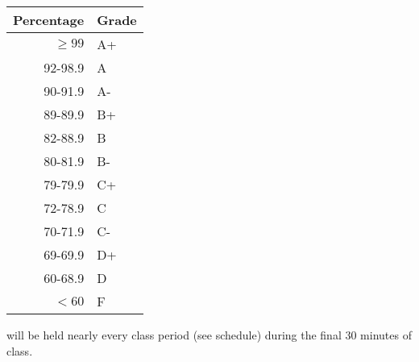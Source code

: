 \documentclass{tufte-handout}
\begin{document}
\begin{margintable}
\begin{tabular}{rl}
Percentage & Grade \\
\hline 
$\ge99$ & A+ \\
92-98.9 & A \\
90-91.9 & A- \\
89-89.9 & B+ \\
82-88.9 & B \\
80-81.9 & B- \\
79-79.9 & C+ \\
72-78.9 & C \\
70-71.9 & C- \\
69-69.9 & D+ \\
60-68.9 & D \\
$<60$ & F \\
\hline
\end{tabular}
\end{margintable}






 will be held nearly every class period (see schedule) during the final 30 minutes of class. 
\end{document}
